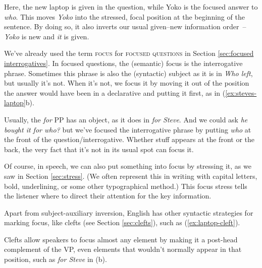 \label{ex:whose-laptop}
\z

Here, the new laptop is given in the question, while Yoko is the focused answer to \textit{who}. This moves \textit{Yoko} into the stressed, focal position at the beginning of the sentence. By doing so, it also inverts our usual given--new information order~-- \textit{Yoko} is new and \textit{it} is given.

We've already used the term \textsc{focus} for \textsc{focused questions} in Section \ref{sec:focused interrogatives}. In focused questions, the (semantic) focus is the interrogative phrase. Sometimes this phrase is also the (syntactic) subject as it is in \textit{Who left}, but usually it's not. When it's not, we focus it by moving it out of the position the answer would have been in a declarative and putting it first, as in (\ref{ex:steves-laptop}b). 


Usually, the \textit{for} PP has an object, as it does in \textit{for Steve}. And we could ask \textit{he bought it for who?} but we've focused the interrogative phrase by putting \textit{who} at the front of the question/interrogative. Whether stuff appears at the front or the back, the very fact that it's not in its usual spot can focus it.

Of course, in speech, we can also put something into focus by stressing it, as we saw in Section \ref{sec:stress}. (We often represent this in writing with capital letters, bold, underlining, or some other typographical method.) This focus stress tells the listener where to direct their attention for the key information.

Apart from subject-auxiliary inversion, English has other syntactic strategies for marking focus, like clefts (see Section \ref{sec:clefts}), such as (\ref{ex:laptop-cleft}).

\ea\label{ex:laptop-cleft}
    \z
\z

Clefts allow speakers to focus almost any element by making it a post-head complement of the VP, even elements that wouldn't normally appear in that position, such as \textit{for Steve} in (b).

